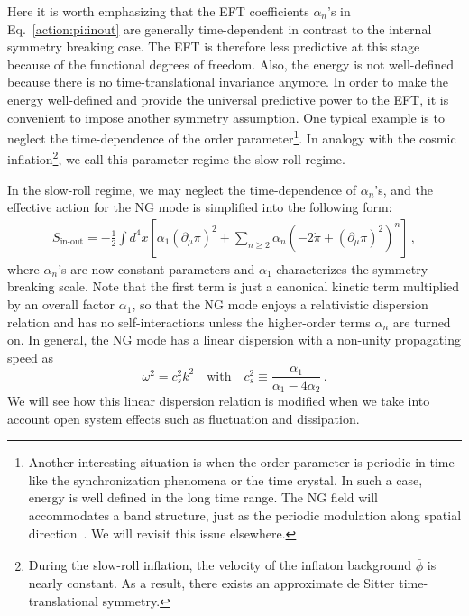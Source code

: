 \documentclass[a4paper,11pt]{article}
\newcommand{\with}{{\quad\mathrm{with}}\quad}
\begin{document}
\medskip
Here it is worth emphasizing that the EFT coefficients $\alpha_n$'s 
in Eq.~\eqref{action:pi:inout} are generally 
time-dependent in contrast to the internal symmetry breaking case.
The EFT is therefore less predictive at this stage because of the functional degrees of freedom. Also, the energy is not well-defined because there is no time-translational invariance anymore.
In order to make the energy well-defined and provide the universal
predictive power to the EFT, it is convenient to impose another symmetry assumption. One typical example is to neglect the time-dependence of the order parameter\footnote{
Another interesting situation is when the order parameter is periodic in time like the 
synchronization phenomena or the time crystal.
In such a case, energy is well defined in the long time range. 
The NG field will accommodates a band structure, 
just as the periodic modulation along spatial direction~\cite{Hidaka:2015xza}. We will revisit this issue elsewhere.}.
In analogy with the cosmic inflation\footnote{During the slow-roll inflation, the velocity of the inflaton 
background $\dot{\bar{\phi}}$ is nearly constant. 
As a result, there exists an approximate de Sitter time-translational symmetry.},
we call this parameter regime the slow-roll regime.

\medskip
In the slow-roll regime, we may neglect 
the time-dependence of $\alpha_n$'s, and the effective action for the NG mode 
is simplified into the following form:
\begin{align}
 \label{slow-roll_in-out}
 S_{\text{in-out}} 
 = - \frac{1}{2} \int d^4x
 \left[ \alpha_1 (\partial_\mu\pi)^2 + 
 \sum_{n\geq2} \alpha_n \left(-2\dot{\pi} + (\partial_\mu\pi)^2 \right)^n
 \right]\,,
\end{align}
where $\alpha_n$'s are now constant parameters
and $\alpha_1$ characterizes the symmetry breaking scale.
Note that the first term is just a canonical kinetic term multiplied 
by an overall factor $\alpha_1$, so that the NG mode enjoys a relativistic dispersion relation and has no self-interactions unless the higher-order terms $\alpha_n$ are turned on. In general, the NG mode has a linear dispersion with a non-unity propagating speed as
\begin{equation}
 \omega^2 = c_s^2 k^2 \with 
  c_s^2 \equiv \frac{\alpha_1}{ \alpha_1 - 4 \alpha_2}\,.
\end{equation}
We will see how this linear dispersion relation is modified when 
we take into account open system effects such as fluctuation and dissipation. 
\end{document}
